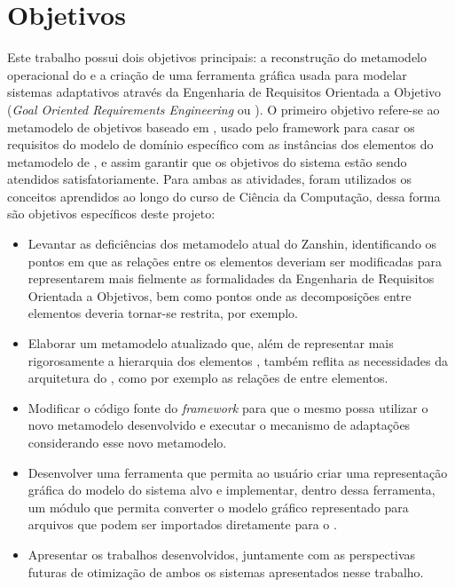 \section{Objetivos}
\label{sec-intro-objetivos}

Este trabalho possui dois objetivos principais: a reconstrução do metamodelo operacional do \zanshin e a criação de uma ferramenta gráfica usada para modelar sistemas adaptativos através da Engenharia de Requisitos Orientada a Objetivo (\textit{Goal Oriented Requirements Engineering} ou \gore). O primeiro objetivo refere-se ao metamodelo de objetivos baseado em \istar, usado pelo framework para casar os requisitos do modelo de domínio específico com as instâncias dos elementos do metamodelo de \gore, e assim garantir que os objetivos do sistema estão sendo atendidos satisfatoriamente. Para ambas as atividades, foram utilizados os conceitos aprendidos ao longo do curso de Ciência da Computação, dessa forma são objetivos específicos deste projeto:

\begin{itemize}
	
	\item Levantar as deficiências dos metamodelo atual do Zanshin, identificando os pontos em que as relações entre os elementos deveriam ser modificadas para representarem mais fielmente as formalidades da Engenharia de Requisitos Orientada a Objetivos, bem como pontos onde as decomposições entre elementos deveria tornar-se restrita, por exemplo.
	
	\item Elaborar um metamodelo atualizado que, além de representar mais rigorosamente a hierarquia dos elementos \gore, também reflita as necessidades da arquitetura do \zanshin, como por exemplo as relações de entre elementos.
	
	\item Modificar o código fonte do \textit{framework} para que o mesmo possa utilizar o novo metamodelo desenvolvido e executar o mecanismo de adaptações considerando esse novo metamodelo.
	
	\item Desenvolver uma ferramenta que permita ao usuário criar uma representação gráfica do modelo do sistema alvo e implementar, dentro dessa ferramenta, um módulo que permita converter o modelo gráfico representado para arquivos \xml que podem ser importados diretamente para o \zanshin.
	
	\item Apresentar os trabalhos desenvolvidos, juntamente com as perspectivas futuras de otimização de ambos os sistemas apresentados nesse trabalho.

\end{itemize}


